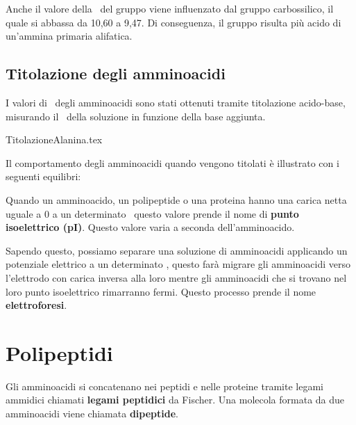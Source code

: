 Anche il valore della \pKa\ del gruppo  viene influenzato dal gruppo carbossilico, il quale si abbassa da 10,60 a 9,47. Di conseguenza, il gruppo  risulta più acido di un'ammina primaria alifatica.

\subsection{Titolazione degli amminoacidi}
I valori di \pKa\ degli amminoacidi sono stati ottenuti tramite titolazione acido-base, misurando il \pH\ della soluzione in funzione della base aggiunta.

{TitolazioneAlanina.tex}

Il comportamento degli amminoacidi quando vengono titolati è illustrato con i seguenti equilibri:
\begin{reaction}
	\arrow{<=>[\chemfig{H\charge{45:3pt=\chargeColor{-}}{O}}][\chemfig{\charge{30:3pt=\chargeColor{+}}{H}}]}
	\arrow{<=>[\chemfig{H\charge{45:3pt=\chargeColor{-}}{O}}][\chemfig{\charge{30:3pt=\chargeColor{+}}{H}}]}
\end{reaction}

Quando un amminoacido, un polipeptide o una proteina hanno una carica netta uguale a 0 a un determinato \pH\ questo valore prende il nome di \textbf{punto isoelettrico (pI)}. Questo valore varia a seconda dell'amminoacido.

Sapendo questo, possiamo separare una soluzione di amminoacidi applicando un potenziale elettrico a un determinato \pH, questo farà migrare gli amminoacidi verso l'elettrodo con carica inversa alla loro mentre gli amminoacidi che si trovano nel loro punto isoelettrico rimarranno fermi. Questo processo prende il nome \textbf{elettroforesi}.

\section{Polipeptidi}
Gli amminoacidi si concatenano nei peptidi e nelle proteine tramite legami ammidici chiamati \textbf{legami peptidici} da Fischer. Una molecola formata da due amminoacidi viene chiamata \textbf{dipeptide}.

